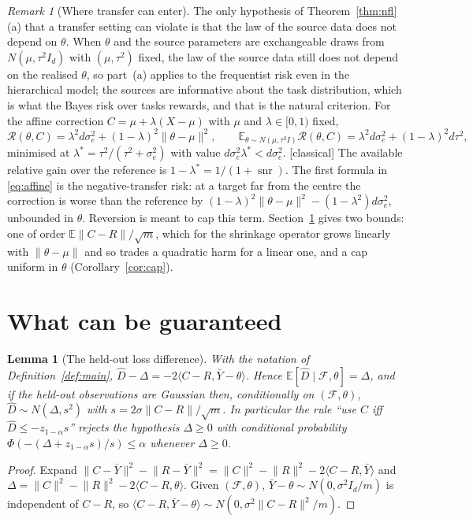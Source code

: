 \documentclass[10pt,a4paper]{article}
\theoremstyle{plain}
\newtheorem{lemma}[theorem]{Lemma}
\theoremstyle{definition}
\theoremstyle{remark}
\newtheorem{remark}[theorem]{Remark}
\newcommand{\E}{\mathbb{E}}
\newcommand{\risk}{\mathcal{R}}
\newcommand{\Dh}{\widehat{D}}
\newcommand{\Ybar}{\bar{Y}}
\newcommand{\norm}[1]{\lVert #1\rVert}
\newcommand{\ip}[1]{\langle #1\rangle}
\newcommand{\status}[1]{\textsf{\small [#1]}}
\DeclareMathOperator{\snr}{snr}
\begin{document}
\begin{remark}[Where transfer can enter]\label{rem:enter}
The only hypothesis of Theorem~\ref{thm:nfl}(a) that a transfer setting can violate is that the law of the source data does not depend on $\theta$. When $\theta$ and the source parameters are exchangeable draws from $N(\mu,\tau^2 I_d)$ with $(\mu,\tau^2)$ fixed, the law of the source data still does not depend on the realised $\theta$, so part~(a) applies to the frequentist risk even in the hierarchical model; the sources are informative about the task distribution, which is what the Bayes risk over tasks rewards, and that is the natural criterion. For the affine correction $C=\mu+\lambda(X-\mu)$ with $\mu$ and $\lambda\in[0,1)$ fixed,
\begin{equation}\label{eq:affine}
\risk(\theta,C)=\lambda^2 d\sigma_e^2+(1-\lambda)^2\norm{\theta-\mu}^2,\qquad
\E_{\theta\sim N(\mu,\tau^2 I)}\risk(\theta,C)=\lambda^2 d\sigma_e^2+(1-\lambda)^2 d\tau^2,
\end{equation}
minimised at $\lambda^\ast=\tau^2/(\tau^2+\sigma_e^2)$ with value $d\sigma_e^2\lambda^\ast<d\sigma_e^2$. \status{classical} The available relative gain over the reference is $1-\lambda^\ast=1/(1+\snr)$. The first formula in \eqref{eq:affine} is the negative-transfer risk: at a target far from the centre the correction is worse than the reference by $(1-\lambda)^2\norm{\theta-\mu}^2-(1-\lambda^2)d\sigma_e^2$, unbounded in $\theta$. Reversion is meant to cap this term. Section~\ref{sec:can} gives two bounds: one of order $\E\norm{C-R}/\sqrt m$, which for the shrinkage operator grows linearly with $\norm{\theta-\mu}$ and so trades a quadratic harm for a linear one, and a cap uniform in $\theta$ (Corollary~\ref{cor:cap}).
\end{remark}

\section{What can be guaranteed}\label{sec:can}

\begin{lemma}[The held-out loss difference]\label{lem:unbiased}
With the notation of Definition~\ref{def:main}, $\Dh-\Delta=-2\ip{C-R,\Ybar-\theta}$. Hence $\E[\Dh\mid\mathcal F,\theta]=\Delta$, and if the held-out observations are Gaussian then, conditionally on $(\mathcal F,\theta)$, $\Dh\sim N(\Delta,s^2)$ with $s=2\sigma\norm{C-R}/\sqrt m$. In particular the rule ``use $C$ iff $\Dh\le -z_{1-\alpha}s$'' rejects the hypothesis $\Delta\ge0$ with conditional probability $\Phi(-(\Delta+z_{1-\alpha}s)/s)\le\alpha$ whenever $\Delta\ge0$.
\end{lemma}
\begin{proof}
Expand $\norm{C-\Ybar}^2-\norm{R-\Ybar}^2=\norm{C}^2-\norm{R}^2-2\ip{C-R,\Ybar}$ and $\Delta=\norm{C}^2-\norm{R}^2-2\ip{C-R,\theta}$. Given $(\mathcal F,\theta)$, $\Ybar-\theta\sim N(0,\sigma^2 I_d/m)$ is independent of $C-R$, so $\ip{C-R,\Ybar-\theta}\sim N(0,\sigma^2\norm{C-R}^2/m)$.
\end{proof}
\end{document}
